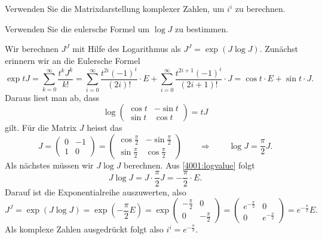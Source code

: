 Verwenden Sie die Matrixdarstellung komplexer Zahlen, um $i^i$ zu
berechnen.

\begin{hinweis}
Verwenden Sie die eulersche Formel um $\log J$ zu bestimmen.
\end{hinweis}

\begin{loesung}
Wir berechnen $J^J$ mit Hilfe des Logarithmus als
$J^J = \exp(J\log J)$.
Zunächst erinnern wir an die Eulersche Formel
\[
\exp tJ
=
\sum_{k=0}^\infty \frac{t^k J^k}{k!}
=
\sum_{i=0}^\infty \frac{t^{2i}(-1)^i}{(2i)!}\cdot E
+
\sum_{i=0}^\infty \frac{t^{2i+1}(-1)^i}{(2i+1)!}\cdot J
=
\cos t\cdot E
+
\sin t\cdot J.
\]
Daraus liest man ab, dass 
\[
\log \begin{pmatrix}
\cos t&-\sin t\\
\sin t& \cos t
\end{pmatrix}
=
tJ
\]
gilt.
Für die Matrix $J$ heisst das
\begin{equation}
J = \begin{pmatrix}
0&-1\\1&0
\end{pmatrix}
=
\begin{pmatrix}
\cos\frac{\pi}2&-\sin\frac{\pi}2\\
\sin\frac{\pi}2& \cos\frac{\pi}2
\end{pmatrix}
\qquad\Rightarrow\qquad
\log J = \frac{\pi}2 J.
\label{4001:logvalue}
\end{equation}
Als nächstes müssen wir $J\log J$ berechnen.
Aus \eqref{4001:logvalue} folgt
\[
J\log J = J\cdot \frac{\pi}2J = - \frac{\pi}2 \cdot E.
\]
Darauf ist die Exponentialreihe auszuwerten, also
\[
J^J
=
\exp (J\log J)
=
\exp(-\frac{\pi}2 E)
=
\exp
\begin{pmatrix}
-\frac{\pi}2&0\\
0&-\frac{\pi}2
\end{pmatrix}
=
\begin{pmatrix}
e^{-\frac{\pi}2}&0\\
0&e^{-\frac{\pi}2}
\end{pmatrix}
=
e^{-\frac{\pi}2} E.
\]
Als komplexe Zahlen ausgedrückt folgt also $i^i = e^{-\frac{\pi}2}$.
\end{loesung}
